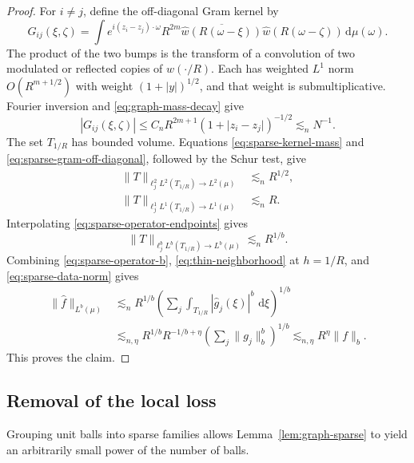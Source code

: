 \documentclass[11pt]{article}
\numberwithin{equation}{section}
\newcommand{\dd}{\,\mathrm{d}}
\newcommand{\norm}[1]{\lVert #1\rVert}
\newcommand{\abs}[1]{\lvert #1\rvert}
\begin{document}
\begin{proof}
For \(i\ne j\), define the off-diagonal Gram kernel by
\[
 G_{ij}(\xi,\zeta)=\int e^{i(z_i-z_j)\cdot\omega}
      R^{2m}\overline{\widehat w(R(\omega-\xi))}
                 \widehat w(R(\omega-\zeta))\dd\mu(\omega).
\]
The product of the two bumps is the transform of a convolution of
two modulated or reflected copies of \(w(\cdot/R)\).
Each has weighted \(L^1\) norm \(O(R^{m+1/2})\) with weight
\((1+\abs y)^{1/2}\), and that weight is submultiplicative.
Fourier inversion and \eqref{eq:graph-mass-decay} give
\begin{equation}\label{eq:sparse-gram-off-diagonal}
 |G_{ij}(\xi,\zeta)|
 \le C_nR^{2m+1}(1+\abs{z_i-z_j})^{-1/2}
 \lesssim_n N^{-1}.
\end{equation}
The set \(T_{1/R}\) has bounded volume.
Equations \eqref{eq:sparse-kernel-mass} and
\eqref{eq:sparse-gram-off-diagonal}, followed by the Schur test, give
\begin{equation}\label{eq:sparse-operator-endpoints}
 \begin{aligned}
 \norm T_{\ell^2_jL^2(T_{1/R})\to L^2(\mu)}&\lesssim_nR^{1/2},\\
 \norm T_{\ell^1_jL^1(T_{1/R})\to L^1(\mu)}&\lesssim_nR.
 \end{aligned}
\end{equation}
Interpolating \eqref{eq:sparse-operator-endpoints} gives
\begin{equation}\label{eq:sparse-operator-b}
 \norm T_{\ell^b_jL^b(T_{1/R})\to L^b(\mu)}
 \lesssim_n R^{1/b}.
\end{equation}
Combining \eqref{eq:sparse-operator-b},
\eqref{eq:thin-neighborhood} at \(h=1/R\), and
\eqref{eq:sparse-data-norm} gives
\begin{align*}
 \norm{\widehat f}_{L^b(\mu)}
 &\lesssim_nR^{1/b}
   \left(\sum_j\int_{T_{1/R}}|\widehat g_j(\xi)|^b\,\dd\xi\right)^{1/b}\\
 &\lesssim_{n,\eta}R^{1/b}R^{-1/b+\eta}
             \left(\sum_j\norm{g_j}_b^b\right)^{1/b}
 \lesssim_{n,\eta}R^\eta\norm f_b.
\end{align*}
This proves the claim.
\end{proof}

\subsection{Removal of the local loss}

Grouping unit balls into sparse families allows
Lemma~\ref{lem:graph-sparse} to yield an arbitrarily small power of
the number of balls.
\end{document}
